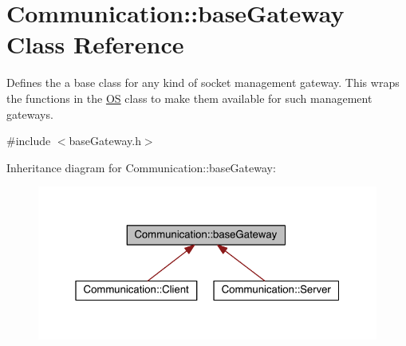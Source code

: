 \hypertarget{class_communication_1_1base_gateway}{}\section{Communication\+:\+:base\+Gateway Class Reference}
\label{class_communication_1_1base_gateway}


Defines the a base class for any kind of socket management gateway. This wraps the functions in the \hyperlink{class_communication_1_1_o_s}{O\+S} class to make them available for such management gateways.  




{\ttfamily \#include $<$base\+Gateway.\+h$>$}



Inheritance diagram for Communication\+:\+:base\+Gateway\+:\nopagebreak
\begin{figure}[H]
\begin{center}
\leavevmode
\includegraphics[width=350pt]{class_communication_1_1base_gateway__inherit__graph}
\end{center}
\end{figure}
